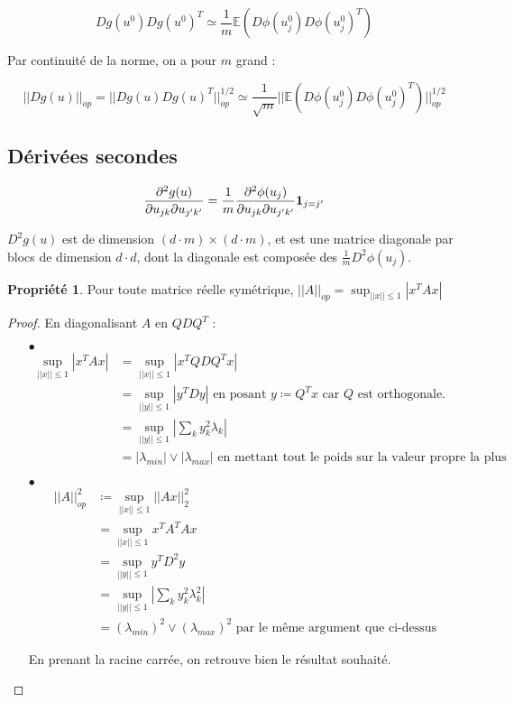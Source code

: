 \documentclass[a4paper, 11pt, french]{article}
\theoremstyle{definition}
\newtheorem{property}{Propriété}
\begin{document}
\[Dg(u^0) Dg(u^0)^T \simeq \frac{1}{m} \mathbb{E}(D \phi(u^0_j) D \phi(u^0_j)^T)\]

Par continuité de la norme, on a pour $m$ grand :

\[||Dg(u)||_{op} = ||Dg(u)Dg(u)^T||_{op}^{1/2} \simeq \frac{1}{\sqrt{m}} ||\mathbb{E}(D \phi(u^0_j) D \phi(u^0_j)^T)||_{op}^{1/2}\]

\subsection{Dérivées secondes}

\[\frac{\partial^2 g(u)}{\partial u_{jk} \partial u_{j'k'}} = \frac{1}{m} \frac{\partial^2 \phi (u_j)}{\partial u_{jk} \partial u_{j'k'}} {\bf 1}_{j = j'} \]

$D^2 g(u)$ est de dimension $(d\cdot m) \times (d\cdot m)$, et est une matrice diagonale par blocs de dimension $d\cdot d$, dont la diagonale est composée des $\frac{1}{m} D^2 \phi (u_j)$. \\

\begin{property}
	Pour toute matrice réelle symétrique, $||A||_{op} = \sup_{||x|| \leq 1} |x^T A x|$
\end{property}
\begin{proof}
	En diagonalisant $A$ en $QDQ^T$ :
	\begin{itemize}
		\item[$\bullet$]
		\begin{align*}
			\sup_{||x|| \leq 1} |x^T A x| &= \sup_{||x|| \leq 1} |x^T QDQ^T x| \\
			&= \sup_{||y|| \leq 1} |y^T Dy| \text{ en posant $y \coloneqq Q^T x$ car $Q$ est orthogonale.}  \\
			&= \sup_{||y|| \leq 1} \left | \sum_{k} y_k^2 \lambda_k \right | \\
			&= |\lambda_{min}| \lor |\lambda_{max}| \text{ en mettant tout le poids sur la valeur propre la plus extrême.}
		\end{align*}
		
		\item[$\bullet$]
		\begin{align*}
			||A||_{op}^2 &\coloneqq \sup_{||x|| \leq 1} ||Ax||_2^2 \\
			&= \sup_{||x|| \leq 1} x^T A^T A x \\
			&= \sup_{||y|| \leq 1} y^T D^2 y \\
			&= \sup_{||y|| \leq 1} \left | \sum_{k} y_k^2 \lambda_k^2 \right | \\
			&= (\lambda_{min})^2 \lor (\lambda_{max})^2 \text{ par le même argument que ci-dessus}
		\end{align*}
		
		En prenant la racine carrée, on retrouve bien le résultat souhaité.
	\end{itemize}
	
\end{proof}
\end{document}
